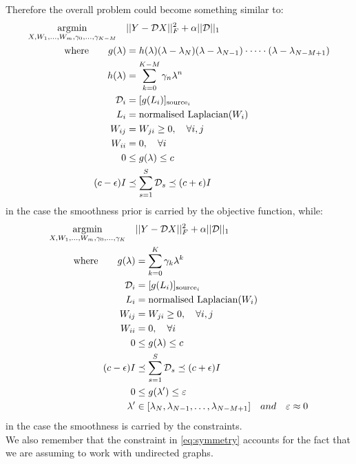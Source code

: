 Therefore the overall problem could become something similar to:
\begin{align}
\underset{{X,W_1,\dots,W_m,\gamma_0,\dots,\gamma_{K-M}}}{\arg\!\min} \quad& ||Y - \mathcal{D}X||^2_F + \alpha||\mathcal{D}||_1 \label{eq:overallProblem}\\
\text{where} \qquad g(\lambda) &= h(\lambda)(\lambda - \lambda_N)(\lambda - \lambda_{N-1})\cdot \dots \cdot (\lambda - \lambda_{N-M+1}) \notag\\
h(\lambda) &= \sum_{k=0}^{K-M}\gamma_n\lambda^{n} \notag\\
\mathcal{D}_i &= [g(L_i)]_{\text{source}_i} \notag\\
L_i &= \text{normalised Laplacian}(W_i) \notag\\
W_{ij} &= W_{ji} \geq 0, \quad \forall i,j \label{eq:symmetry}\\
W_{ii} &= 0, \quad \forall i \notag\\
0 &\leq g(\lambda) \leq c \notag\\
(c-\epsilon)I &\preceq \sum_{s=1}^{S}\mathcal{D}_s \preceq (c+\epsilon)I \notag
\end{align}
in the case the smoothness prior is carried by the objective function, while:
\begin{align}
\underset{{X,W_1,\dots,W_m,\gamma_0,\dots,\gamma_{K}}}{\arg\!\min} \quad& ||Y - \mathcal{D}X||^2_F + \alpha||\mathcal{D}||_1 \label{eq:overallProblem2}\\
\text{where} \qquad g(\lambda) &= \sum_{k=0}^{K}\gamma_k\lambda^{k} \notag\\
\mathcal{D}_i &= [g(L_i)]_{\text{source}_i} \notag\\
L_i &= \text{normalised Laplacian}(W_i) \notag\\
W_{ij} &= W_{ji} \geq 0, \quad \forall i,j \label{eq:symmetry2}\\
W_{ii} &= 0, \quad \forall i \notag\\
0 &\leq g(\lambda) \leq c \notag\\
(c-\epsilon)I &\preceq \sum_{s=1}^{S}\mathcal{D}_s \preceq (c+\epsilon)I \notag\\
0 & \leq g(\lambda') \leq \varepsilon \notag\\
\lambda' &\in [\lambda_{N}, \lambda_{N-1},\dots,\lambda_{N-M+1}] \quad and \quad \varepsilon \approx 0 \label{eq:ProblemPresGeneral}
\end{align}
in the case the smoothness is carried by the constraints.\\
We also remember that the constraint in \autoref{eq:symmetry} accounts for the fact that we are assuming to work with undirected graphs.\\

